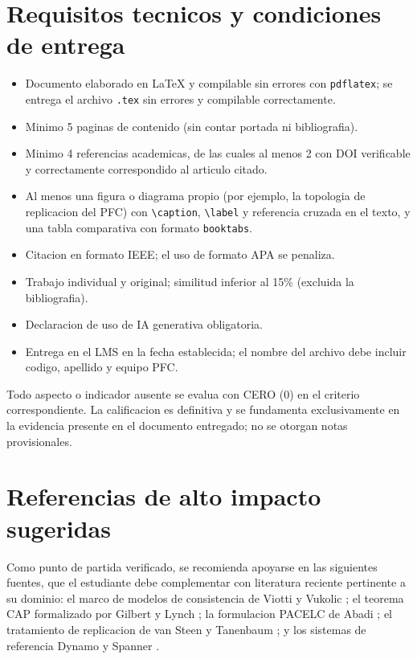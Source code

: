 \documentclass[11pt,a4paper]{article}
\newcommand{\uteqbox}[2]{%
    \begin{tcolorbox}[colback=uteqSoft,colframe=uteqBlue,boxrule=0.8pt,arc=2pt,left=6pt,right=6pt,top=5pt,bottom=5pt,title=#1,fonttitle=\bfseries]
        #2
    \end{tcolorbox}%
}
\begin{document}
\section{Requisitos tecnicos y condiciones de entrega}
\begin{itemize}
    \item Documento elaborado en LaTeX y compilable sin errores con \texttt{pdflatex}; se entrega el archivo \texttt{.tex} sin errores y compilable correctamente.
    \item Minimo 5 paginas de contenido (sin contar portada ni bibliografia).
    \item Minimo 4 referencias academicas, de las cuales al menos 2 con DOI verificable y correctamente correspondido al articulo citado.
    \item Al menos una figura o diagrama propio (por ejemplo, la topologia de replicacion del PFC) con \texttt{\textbackslash caption}, \texttt{\textbackslash label} y referencia cruzada en el texto, y una tabla comparativa con formato \texttt{booktabs}.
    \item Citacion en formato IEEE; el uso de formato APA se penaliza.
    \item Trabajo individual y original; similitud inferior al 15\% (excluida la bibliografia).
    \item Declaracion de uso de IA generativa obligatoria.
    \item Entrega en el LMS en la fecha establecida; el nombre del archivo debe incluir codigo, apellido y equipo PFC.
\end{itemize}

\uteqbox{Piso de evaluacion (no negociable)}{%
Todo aspecto o indicador ausente se evalua con CERO (0) en el criterio correspondiente. La calificacion es definitiva y se fundamenta exclusivamente en la evidencia presente en el documento entregado; no se otorgan notas provisionales.%
}

\section{Referencias de alto impacto sugeridas}
Como punto de partida verificado, se recomienda apoyarse en las siguientes fuentes, que el estudiante debe complementar con literatura reciente pertinente a su dominio: el marco de modelos de consistencia de Viotti y Vukolic \parencite{ViottiVukolic2016Consistency}; el teorema CAP formalizado por Gilbert y Lynch \parencite{GilbertLynch2002CAP}; la formulacion PACELC de Abadi \parencite{Abadi2012PACELC}; el tratamiento de replicacion de van Steen y Tanenbaum \parencite{VanSteenTanenbaum2017DS}; y los sistemas de referencia Dynamo \parencite{DeCandia2007Dynamo} y Spanner \parencite{Corbett2013Spanner}.
\end{document}
